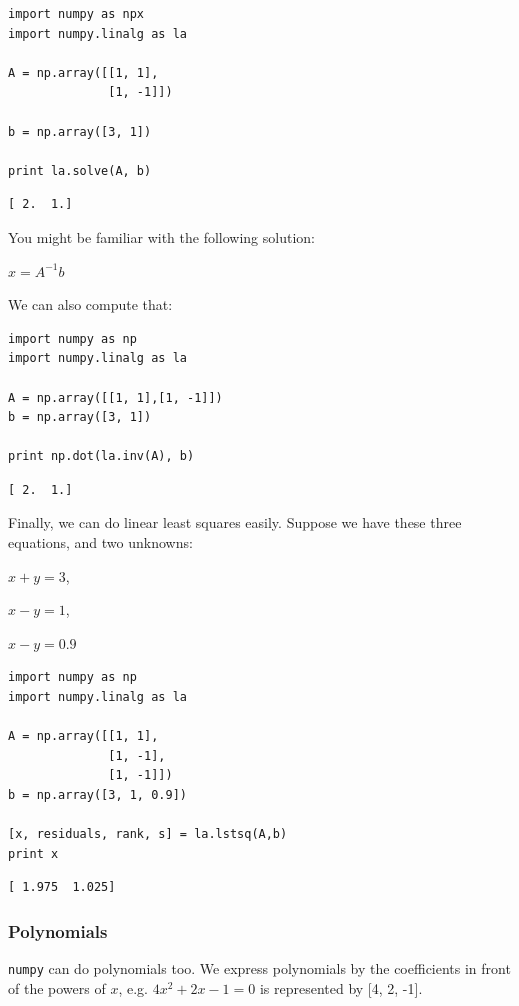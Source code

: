 \documentclass[11pt]{article}
\begin{document}
\begin{verbatim}
import numpy as npx
import numpy.linalg as la

A = np.array([[1, 1],
              [1, -1]])

b = np.array([3, 1])

print la.solve(A, b)
\end{verbatim}

\begin{verbatim}
[ 2.  1.]
\end{verbatim}

You might be familiar with the following solution:

$x = A^{-1} b$

We can also compute that:

\begin{verbatim}
import numpy as np
import numpy.linalg as la

A = np.array([[1, 1],[1, -1]])
b = np.array([3, 1])

print np.dot(la.inv(A), b)
\end{verbatim}

\begin{verbatim}
[ 2.  1.]
\end{verbatim}

Finally, we can do linear least squares easily. Suppose we have these three equations, and two unknowns:

$x + y = 3$,

$x - y = 1$,

$x - y = 0.9$

\begin{verbatim}
import numpy as np
import numpy.linalg as la

A = np.array([[1, 1],
              [1, -1],
              [1, -1]])
b = np.array([3, 1, 0.9])

[x, residuals, rank, s] = la.lstsq(A,b)
print x
\end{verbatim}

\begin{verbatim}
[ 1.975  1.025]
\end{verbatim}


\subsubsection{Polynomials}
\label{sec-3-9-3}
\texttt{numpy} can do polynomials too. We express polynomials by the coefficients in front of the powers of $x$, e.g. $4 x^2 + 2x - 1 = 0$ is represented by [4, 2, -1].
\end{document}
